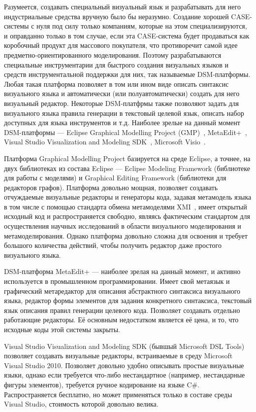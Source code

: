 \documentclass[a4paper]{article}
\begin{document}
Разумеется, создавать специальный визуальный язык и разрабатывать для него индустриальные средства вручную было бы неразумно. Создание хорошей CASE-системы с нуля под силу только компаниям, которые на этом специализируются, и оправданно только в том случае, если эта CASE-система будет продаваться как коробочный продукт для массового покупателя, что противоречит самой идее предметно-ориентированного моделирования. Поэтому разрабатываются специальные инструментарии для быстрого создания визуальных языков и средств инструментальной поддержки для них, так называемые DSM-платформы. Любая такая платформа позволяет в том или ином виде описать синтаксис визуального языка и автоматически (или полуавтоматически) создать для него визуальный редактор. Некоторые DSM-платфрмы также позволяют задать для визуального языка правила генерации в текстовый целевой язык, описать набор доступных для языка инструментов и т.д. Наиболее зрелые на данный момент DSM-платформы --- Eclipse Graphical Modelling Project (GMP)~\cite{gmp}, MetaEdit+~\cite{metaEditPlus}, Visual Studio Visualization and Modeling SDK~\cite{vsvmsdk}, Microsoft Visio~\cite{visio}. 

Платформа Graphical Modelling Project базируется на среде Eclipse, а точнее, на двух библиотеках из состава Eclipse --- Eclipse Modeling Framework (библиотеке для работы с моделями) и Graphical Editing Framework (библиотеки для редакторов графов). Платформа довольно мощная, позволяет создавать отчуждаемые визуальные редакторы и генераторы кода, задавая метамодель языка в том числе с помощью стандарта обмена метамоделями XMI~\cite{xmi}, имеет открытый исходный код и распространяется свободно, являясь фактическим стандартом для осуществления научных исследований в области визуального моделирования и метамоделирования. Однако платформа довольно сложна для освоения и требует большого количества действий, чтобы получить редактор даже простого визуального языка. 

DSM-платформа MetaEdit+ --- наиболее зрелая на данный момент, и активно используется в промышленном программировании. Имеет свой метаязык и графический метаредактор для описания абстрактного синтаксиса визуального языка, редактор формы элементов для задания конкретного синтаксиса, текстовый язык описания правил генерации целевого кода. Позволяет создавать отдельно работающие редакторы. Её основным недостатком является её цена, и то, что исходные коды этой системы закрыты.

Visual Studio Visualization and Modeling SDK (бывшый Microsoft DSL Tools) позволяет создавать визуальные редакторы, встраиваемые в среду Microsoft Visual Studio 2010. Позволяет довольно удобно описывать простые визуальные языки, однако если требуется что-либо нестандартное (например, нестандарные фигуры элементов), требуется ручное кодирование на языке C\#. Распространяется бесплатно, но может применяться только в составе среды Visual Studio, стоимость которой довольно велика.
\end{document}
